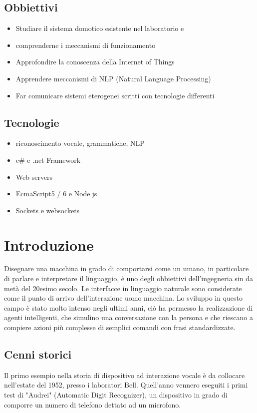\documentclass[twoside]{supsistudent}
\begin{document}
\section*{Obbiettivi}
\begin{itemize}
\item Studiare il sistema domotico esistente nel laboratorio e 
\item comprenderne i meccanismi di funzionamento
\item Approfondire la conoscenza della Internet of Things
\item Apprendere meccanismi di NLP (Natural Language Processing)
\item Far comunicare sistemi eterogenei scritti con tecnologie differenti
\end{itemize}
\section*{Tecnologie}
\begin{itemize}
\item riconoscimento vocale, grammatiche, NLP
\item c\# e .net Framework
\item Web servers
\item EcmaScript5 / 6 e Node.js
\item Sockets e websockets
\end{itemize}
\chapter{Introduzione}

Disegnare una macchina in grado di comportarsi come un umano, in particolare di parlare e interpretare il linguaggio, è uno degli obbiettivi dell'ingegneria sin da metà del 20esimo secolo. Le interfacce in linguaggio naturale sono considerate come il punto di arrivo dell'interazione uomo macchina.
Lo sviluppo in questo campo è stato molto intenso negli ultimi anni, ciò ha permesso la realizzazione di agenti intelligenti, che simulino una conversazione con la persona e che riescano a compiere azioni più complesse di semplici comandi con frasi standardizzate.

\section{Cenni storici}

Il primo esempio nella storia di dispositivo ad interazione vocale è da collocare nell'estate del 1952, presso i laboratori Bell.
Quell'anno vennero eseguiti i primi test di "Audrei" (Automatic Digit Recognizer), un dispositivo in grado di comporre un numero di telefono dettato ad un microfono.
\end{document}
